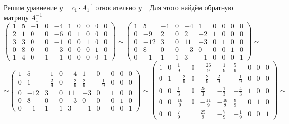 \documentclass{article}
\begin{document}
Решим уравнение $y=c_1 \cdot A_1^{-1}$ относительно $y$
~
\noindent Для этого найдём обратную матрицу $A_1^{-1}$
\begin{equation*}
  \left(\begin{array}{ccccc|cccccc}  
 1 & 5 & -1 & 0 & -4 & 1 & 0 & 0 & 0 & 0\\ 
 2 & 1 & 0 & 0 & -6 & 0 & 1 & 0 & 0 & 0 \\
 3 & 3 & 0 & 0 & -1 & 0 & 0 & 1 & 0 & 0\\
 0 & 8 & 0 & 0 & -3 & 0 & 0 & 0 & 1 & 0\\
 1 & 4 & 0 & 1 & -1 & 0 & 0 & 0 & 0 & 1
\end{array}\right)
\sim
\left(\begin{array}{ccccc|cccccc}  
 1 & 5 & -1 & 0 & -4 & 1 & 0 & 0 & 0 & 0\\ 
 0 & -9 & 2 & 0 & 2 & -2 & 1 & 0 & 0 & 0 \\
 0 & -12 & 3 & 0 & 11 & -3 & 0 & 1 & 0 & 0\\
 0 & 8 & 0 & 0 & -3 & 0 & 0 & 0 & 1 & 0\\
 0 & -1 & 1 & 1 & 3 & -1 & 0 & 0 & 0 & 1
\end{array}\right)
\sim
\end{equation*}
\begin{equation*}
\sim  
\left(\begin{array}{ccccc|cccccc}  
 1 & 5 & -1 & 0 & -4 & 1 & 0 & 0 & 0 & 0\\ 
 0 & 1 & -\frac{2}{9} & 0 & -\frac{2}{9} & \frac{2}{9} & -\frac{1}{9} & 0 & 0 & 0 \\
 0 & -12 & 3 & 0 & 11 & -3 & 0 & 1 & 0 & 0\\
 0 & 8 & 0 & 0 & -3 & 0 & 0 & 0 & 1 & 0\\
 0 & -1 & 1 & 1 & 3 & -1 & 0 & 0 & 0 & 1
\end{array}\right)
\sim
\left(\begin{array}{ccccc|cccccc}  
 1 & 0 & \frac{1}{9} & 0 & -\frac{26}{9} & -\frac{1}{9} & \frac{5}{9} & 0 & 0 & 0\\ 
 0 & 1 & -\frac{2}{9} & 0 & -\frac{2}{9} & \frac{2}{9} & -\frac{1}{9} & 0 & 0 & 0 \\
 0 & 0 & \frac{1}{3} & 0 & \frac{25}{3} & -\frac{1}{3} & -\frac{4}{3} & 1 & 0 & 0\\
 0 & 0 & \frac{16}{9} & 0 & -\frac{11}{9} & -\frac{16}{9} & \frac{8}{9} & 0 & 1 & 0\\
 0 & 0 & \frac{7}{9} & 1 & \frac{25}{9} & -\frac{7}{9} & -\frac{1}{9} & 0 & 0 & 1
\end{array}\right)
\sim
\end{equation*}
\end{document}
